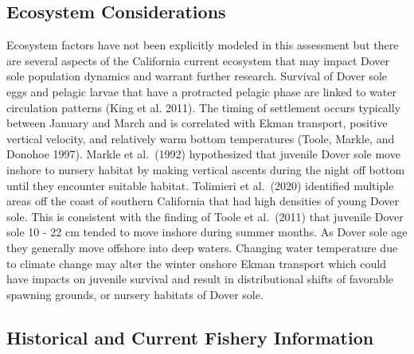 \documentclass[11pt,
  english,
  a4paper,
]{article}
\begin{document}
\hypertarget{ecosystem-considerations-1}{%
\subsection{Ecosystem Considerations}\label{ecosystem-considerations-1}}

\leavevmode\tagmcend\tagstructend


Ecosystem factors have not been explicitly modeled in this assessment but there are several aspects of the California current ecosystem that may impact Dover sole population dynamics and warrant further research. Survival of Dover sole eggs and pelagic larvae that have a protracted pelagic phase are linked to water circulation patterns {(King et al. 2011)\leavevmode\tagmcend\tagstructend}. The timing of settlement occurs typically between January and March and is correlated with Ekman transport, positive vertical velocity, and relatively warm bottom temperatures {(Toole, Markle, and Donohoe 1997)\leavevmode\tagmcend\tagstructend}. Markle et al.~{(1992)\leavevmode\tagmcend\tagstructend} hypothesized that juvenile Dover sole move inshore to nursery habitat by making vertical ascents during the night off bottom until they encounter suitable habitat. Tolimieri et al.~{(2020)\leavevmode\tagmcend\tagstructend} identified multiple areas off the coast of southern California that had high densities of young Dover sole. This is consistent with the finding of Toole et al.~{(2011)\leavevmode\tagmcend\tagstructend} that juvenile Dover sole 10 - 22 cm tended to move inshore during summer months. As Dover sole age they generally move offshore into deep waters. Changing water temperature due to climate change may alter the winter onshore Ekman transport which could have impacts on juvenile survival and result in distributional shifts of favorable spawning grounds, or nursery habitats of Dover sole.

\leavevmode\tagmcend\tagstructend\par


\hypertarget{historical-and-current-fishery-information}{%
\subsection{Historical and Current Fishery Information}\label{historical-and-current-fishery-information}}
\end{document}
